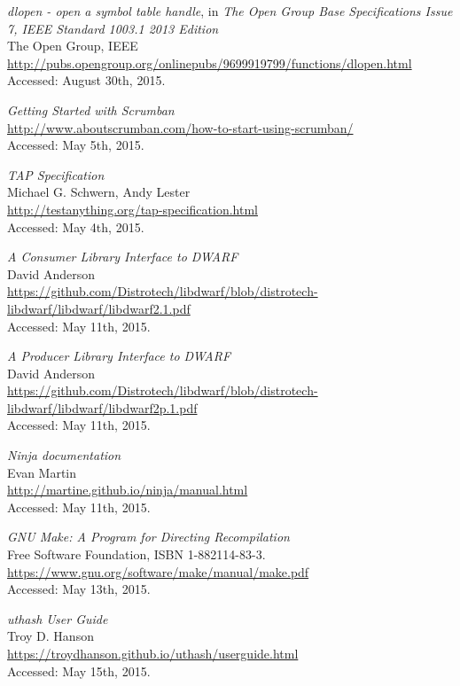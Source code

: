 \begin{thebibliography}{99}
		\emph{dlopen - open a symbol table handle}, in \emph{The Open Group Base
		Specifications Issue 7, IEEE Standard 1003.1 2013 Edition} \\
		The Open Group, IEEE \\
		\url{http://pubs.opengroup.org/onlinepubs/9699919799/functions/dlopen.html}	\\
		Accessed: August 30th, 2015.

		\emph{Getting Started with Scrumban} \\
		\url{http://www.aboutscrumban.com/how-to-start-using-scrumban/} \\
		Accessed: May 5th, 2015.

		\emph{TAP Specification} \\
		Michael G. Schwern, Andy Lester \\
		\url{http://testanything.org/tap-specification.html} \\
		Accessed: May 4th, 2015.

		\emph{A Consumer Library Interface to DWARF} \\
		David Anderson \\
		\url{https://github.com/Distrotech/libdwarf/blob/distrotech-libdwarf/libdwarf/libdwarf2.1.pdf} \\
		Accessed: May 11th, 2015.

		\emph{A Producer Library Interface to DWARF} \\
		David Anderson \\
		\url{https://github.com/Distrotech/libdwarf/blob/distrotech-libdwarf/libdwarf/libdwarf2p.1.pdf} \\
		Accessed: May 11th, 2015.

		\emph{Ninja documentation} \\
		Evan Martin \\
		\url{http://martine.github.io/ninja/manual.html} \\
		Accessed: May 11th, 2015.

		\emph{GNU Make: A Program for Directing Recompilation} \\
		Free Software Foundation, ISBN 1-882114-83-3. \\
		\url{https://www.gnu.org/software/make/manual/make.pdf} \\
		Accessed: May 13th, 2015.

		\emph{uthash User Guide} \\
		Troy D. Hanson \\
		\url{https://troydhanson.github.io/uthash/userguide.html} \\
		Accessed: May 15th, 2015.


\end{thebibliography}
